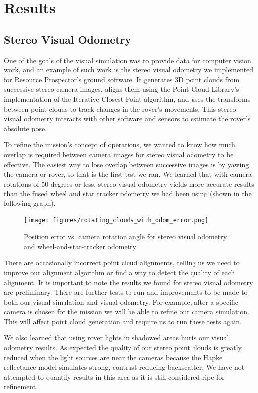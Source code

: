 \documentclass[twocolumn,letterpaper]{IEEEAerospaceCLS}  %
\begin{document}
\section{Results}

\subsection{Stereo Visual Odometry}
One of the goals of the visual simulation was to provide data for computer vision work, and an example of such work is the stereo visual odometry we implemented for Resource Prospector's ground software. It generates 3D point clouds from successive stereo camera images, aligns them using the Point Cloud Library's implementation of the Iterative Closest Point algorithm, and uses the transforms between point clouds to track changes in the rover's movements. This stereo visual odometry interacts with other software and sensors to estimate the rover's absolute pose.

To refine the mission's concept of operations, we wanted to know how much overlap is required between camera images for stereo visual odometry to be effective. The easiest way to lose overlap between successive images is by yawing the camera or rover, so that is the first test we ran. We learned that with camera rotations of 50-degrees or less, stereo visual odometry yields more accurate results than the fused wheel and star tracker odometry we had been using (shown in the following graph).
\begin{figure}[h!]
	\texttt{[image: figures/rotating\_clouds\_with\_odom\_error.png]}
    \caption{Position error vs. camera rotation angle for stereo visual odometry and wheel-and-star-tracker odometry}
\end{figure}

There are occasionally incorrect point cloud alignments, telling us we need to improve our alignment algorithm or find a way to detect the quality of each alignment. It is important to note the results we found for stereo visual odometry are preliminary. There are further tests to run and improvements to be made to both our visual simulation and visual odometry. For example, after a specific camera is chosen for the mission we will be able to refine our camera simulation. This will affect point cloud generation and require us to run these tests again.

We also learned that using rover lights in shadowed areas hurts our visual odometry results. As expected the quality of our stereo point clouds is greatly reduced when the light sources are near the cameras because the Hapke reflectance model simulates strong, contrast-reducing backscatter. We have not attempted to quantify results in this area as it is still considered ripe for refinement.
\end{document}
